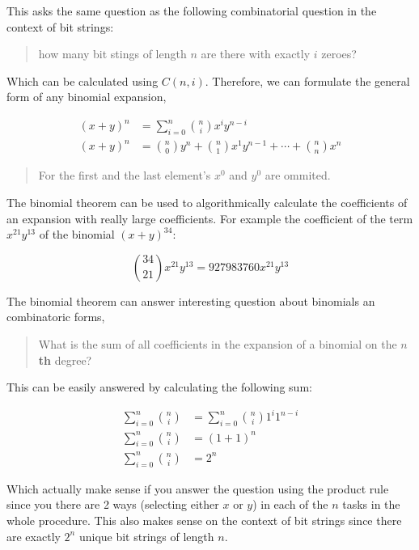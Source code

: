 This asks the same question as the following combinatorial question in
the context of bit strings:

\begin{quote}
how many bit stings of length \textbf{\(n\)} are there with exactly
\textbf{\(i\)} zeroes?
\end{quote}

Which can be calculated using \textbf{\(C(n,i)\)}. Therefore, we can
formulate the general form of any binomial expansion,

\[
\begin{aligned}
(x+y)^n&=\sum_{i=0}^{n}{{n \choose i}x^iy^{n-i}}\\
(x+y)^n&={n \choose 0}y^{n}+{n \choose 1}x^1y^{n-1}+\cdots+{n \choose n}x^n
\end{aligned}
\]

\begin{quote}
For the first and the last element's \textbf{\(x^0\)} and
\textbf{\(y^0\)} are ommited.
\end{quote}

The binomial theorem can be used to algorithmically calculate the
coefficients of an expansion with really large coefficients. For example
the coefficient of the term \textbf{\(x^{21} y^{13}\)} of the binomial
\textbf{\((x+y)^{34}\)}:

\[
{34 \choose 21}x^{21}y^{13}=927983760x^{21}y^{13}
\]

The binomial theorem can answer interesting question about binomials an
combinatoric forms,

\begin{quote}
What is the sum of all coefficients in the expansion of a binomial on
the \textbf{\(n\)th} degree?
\end{quote}

This can be easily answered by calculating the following sum:

\[
\begin{aligned}
\sum_{i=0}^{n}{n \choose i}&=\sum_{i=0}^{n}{n \choose i}1^i 1^{n-i}\\
\sum_{i=0}^{n}{n \choose i}&=(1+1)^n\\
\sum_{i=0}^{n}{n \choose i}&=2^n
\end{aligned}
\]

Which actually make sense if you answer the question using the product
rule since you there are 2 ways (selecting either \textbf{\(x\)} or
\textbf{\(y\)}) in each of the \textbf{\(n\)} tasks in the whole
procedure. This also makes sense on the context of bit strings since
there are exactly \textbf{\(2^n\)} unique bit strings of length
\textbf{\(n\)}.

